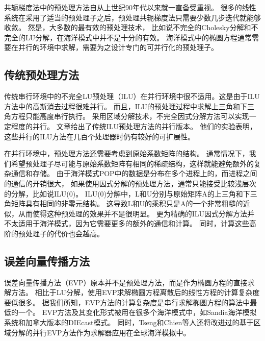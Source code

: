 共轭梯度法中的预处理方法自从上世纪90年代以来就一直备受重视。 
很多的线性系统在采用了适当的预处理子之后，预处理共轭梯度法只需要少数几步迭代就能够收敛。 
然是，大多数的最有效的预处理技术， 比如说不完全的Cholesky分解和不完全的LU分解，在海洋模式中并不是十分的有效。 
海洋模式中的椭圆方程通常需要在并行的环境中求解，需要为之设计专门的可并行化的预处理子。 



\subsection{传统预处理方法}
\label{related:classical}

传统串行环境中的不完全LU预处理（ILU）在并行环境中很不适用。这是由于ILU方法中的高斯消去过程很难并行。 
而且，ILU的预处理过程中求解上三角和下三角方程只能高度串行执行。
采用区域分解技术，不完全因式分解方法可以实现一定程度的并行。 
文章\cite{hysom2001scalable}给出了传统ILU预处理方法的并行版本。 
他们的实验表明，这些并行的ILU方法在几百个处理器时仍有较好的可扩展性。

在并行环境中，预处理方法还需要考虑到原始系数矩阵的结构。 
通常情况下，我们希望预处理子尽可能与原始系数矩阵有相同的稀疏结构，这样就能避免额外的复杂通信和存储。 
由于海洋模式POP中的数据是分布在多个进程上的，而进程之间的通信的开销很大， 如果使用因式分解的预处理方法，通常只能接受比较浅层次的分解，比如说ILU(0)。 
ILU(0)分解中，L和U分别与原始矩阵A的上三角和下三角矩阵具有相同的非零元结构。
这导致L和U的乘积只是A的一个非常粗糙的近似，从而使得这种预处理的效果并不是很明显。 
更为精确的ILU因式分解方法并不太适用于海洋模式，因为它需要更多的额外的通信和计算。 
同时，计算这些高阶的预处理子的代价也会越高。 

\subsection{误差向量传播方法}
\label{related:evp}


误差向量传播方法（EVP）原本并不是预处理方法，而是作为椭圆方程的直接求解方法。 
相比于LU分解，使用EVP求解椭圆方程离散后的线性方程的计算复杂度要低很多。 
据我们所知，EVP方法的计算复杂度是串行求解椭圆方程的算法中最低的一个。
EVP方法及其变化形式被用在很多个海洋模式中，如Sandia海洋模拟系统\cite{dietrich1987ocean}和加拿大版本的DIEcast模式\cite{tseng2011parallel}。 
同时，Tseng和Chien等人还将改进过的基于区域分解的并行EVP方法作为求解器应用在全球海洋模拟中。

